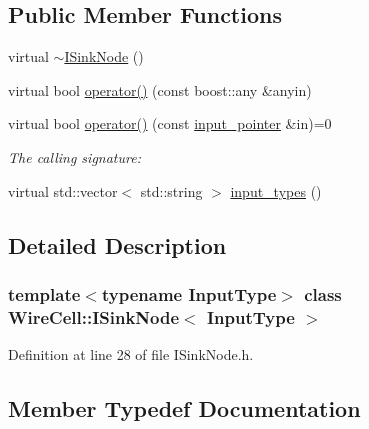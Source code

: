 \subsection*{Public Member Functions}
\begin{DoxyCompactItemize}
\item 
virtual \hyperlink{class_wire_cell_1_1_i_sink_node_a8c3d9d4b70ebb58b99db52ae951c4f67}{$\sim$\+I\+Sink\+Node} ()
\item 
virtual bool \hyperlink{class_wire_cell_1_1_i_sink_node_a793d39beb4d1ab8c3f4639ce1aa337d9}{operator()} (const boost\+::any \&anyin)
\item 
virtual bool \hyperlink{class_wire_cell_1_1_i_sink_node_a80c826fd6b3f184ed26984b46c7fcb20}{operator()} (const \hyperlink{class_wire_cell_1_1_i_sink_node_abec1b6fe3da78c63bbc88c4f3f805d91}{input\+\_\+pointer} \&in)=0
\begin{DoxyCompactList}\small\item\em The calling signature\+: \end{DoxyCompactList}\item 
virtual std\+::vector$<$ std\+::string $>$ \hyperlink{class_wire_cell_1_1_i_sink_node_abe62e5f37a46c15bd6481fb75c86ec85}{input\+\_\+types} ()
\end{DoxyCompactItemize}


\subsection{Detailed Description}
\subsubsection*{template$<$typename Input\+Type$>$\newline
class Wire\+Cell\+::\+I\+Sink\+Node$<$ Input\+Type $>$}



Definition at line 28 of file I\+Sink\+Node.\+h.



\subsection{Member Typedef Documentation}
\mbox{\label{class_wire_cell_1_1_i_sink_node_abec1b6fe3da78c63bbc88c4f3f805d91}} 
